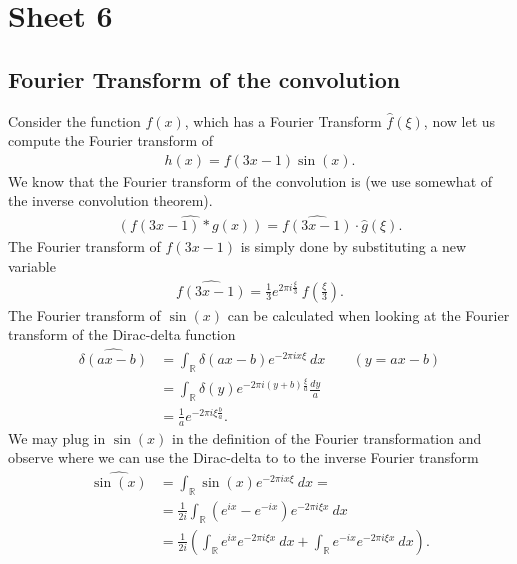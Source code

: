 


\maketitle
\tableofcontents

\section{Sheet 6}
\subsection{Fourier Transform of the convolution}
Consider the function $f(x)$, which has a Fourier Transform $\hat{f}(\xi)$,
now let us compute the Fourier transform of
\begin{align}
    h(x) = f(3x-1) \sin(x) .
\end{align}
We know that the Fourier transform of the convolution is (we use somewhat of
the inverse convolution theorem).
\begin{align}
    \widehat{(f(3x-1)*g(x))} = \widehat{f(3x-1)} \cdot \hat{g}(\xi).
\end{align}
The Fourier transform of $f(3x-1)$ is simply done by substituting a new
variable
\begin{align}
    \widehat{f(3x-1)} = \frac{1}{3}e^{2\pi i\frac{\xi}{3}}\
    f\left(\frac{\xi}{3}\right).
\end{align}
The Fourier transform of $\sin(x)$ can be calculated when looking at the
Fourier transform of the Dirac-delta function
\begin{align}
    \widehat{\delta(ax-b)}
    &=\int_\mathbb{R} \delta(ax-b) e^{-2\pi i x \xi}\ dx
    \;\;\;\;\;\;\; (y = ax-b)\\
    &=\int_\mathbb{R} \delta(y) e^{-2\pi i (y+b)\frac{\xi}{a}}\frac{dy}{a}\\
    &=\frac{1}{a} e^{-2\pi i \xi \frac{b}{a}}.
\end{align}
We may plug in $\sin(x)$ in the definition of the Fourier transformation and
observe where we can use the Dirac-delta to to the inverse Fourier transform
\begin{align}
    \widehat{\sin(x)}
    &=\int_\mathbb{R} \sin(x)e^{-2\pi i x\xi}\ dx=\\
    &=\frac{1}{2i}\int_\mathbb{R} (e^{ix} - e^{-ix})e^{-2\pi i \xi x}\ dx\\
    &=\frac{1}{2i}\left(
        \int_\mathbb{R} e^{ix} e^{-2\pi i \xi x}\ dx+
        \int_\mathbb{R} e^{-ix} e^{-2\pi i \xi x}\ dx
        \right).
\end{align}
